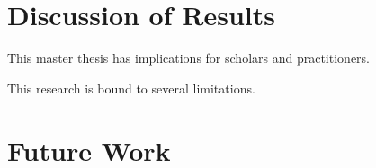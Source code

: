 \section{Discussion of Results}
This master thesis has implications for scholars and practitioners.
\begin{comment}
    - what was achieved
    -what implications for
    1 zkp field of research
    2 mro industry
\end{comment}

This research is bound to several limitations.
\begin{comment}
    
\end{comment}
\section{Future Work}
\begin{comment}
- zusammenführen der artefakte in RAPADO
- recursive snarks -->auf den ersten Teil der EInleitung beziehen mit so vielen dokumenten zum verifizieren gleichzeitig usw.
\end{comment}